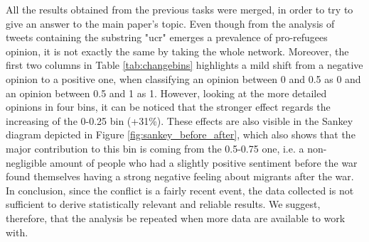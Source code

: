 \documentclass[sigchi]{acmart}
\begin{document}
All the results obtained from the previous tasks were merged, in order to try to give an answer to the main paper's topic. Even though from the analysis of tweets containing the substring "ucr" emerges a prevalence of pro-refugees opinion, it is not exactly the same by taking the whole network. Moreover, the first two columns in Table \ref{tab:changebins} highlights a mild shift from a negative opinion to a positive one, when classifying an opinion between 0 and 0.5 as 0 and an opinion between 0.5 and 1 as 1. However, looking at the more detailed opinions in four bins, it can be noticed that the stronger effect regards the increasing of the 0-0.25 bin (+31\%). These effects are also visible in the Sankey diagram depicted in Figure \ref{fig:sankey_before_after}, which also shows that the major contribution to this bin is coming from the 0.5-0.75 one, i.e. a non-negligible amount of people who had a slightly positive sentiment before the war found themselves having a strong negative feeling about migrants after the war.
In conclusion, since the conflict is a fairly recent event, the data collected is not sufficient to derive statistically relevant and reliable results. We suggest, therefore, that the analysis be repeated when more data are available to work with.



\end{document}
